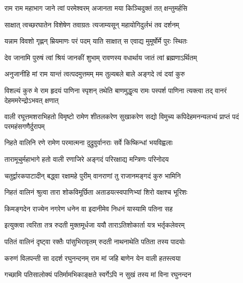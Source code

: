 \twolineshloka
{राम राम महाभाग जाने त्वां परमेश्वरम्}
{अजानता मया किञ्चिदुक्तं तत् क्षन्तुमर्हसि} %

\twolineshloka
{साक्षात् त्वच्छरघातेन विशेषेण तवाग्रतः}
{त्यजाम्यसून् महायोगिदुर्लभं तव दर्शनम्} %

\twolineshloka
{यन्नाम विवशो गृह्णन् म्रियमाणः परं पदम्}
{याति साक्षात् स एवाद्य मुमूर्षोर्मे पुरः स्थितः} %

\twolineshloka
{देव जानामि पुरुषं त्वां श्रियं जानकीं शुभाम्}
{रावणस्य वधार्थाय जातं त्वां ब्रह्मणाऽर्थितम्} %

\twolineshloka
{अनुजानीहि मां राम यान्तं त्वत्पदमुत्तमम्}
{मम तुल्यबले बाले अङ्गदे त्वं दयां कुरु} %

\threelineshloka
{विशल्यं कुरु मे राम हृदयं पाणिना स्पृशन्}
{तथेति बाणमुद्धृत्य रामः पस्पर्श पाणिना}
{त्यक्त्वा तद् वानरं देहममरेन्द्रोऽभवत् क्षणात्} %

\fourlineindentedshloka
{वाली रघूत्तमशराभिहतो विमृष्टो}
{रामेण शीतलकरेण सुखाकरेण}
{सद्यो विमुच्य कपिदेहमनन्यलभ्यं}
{प्राप्तं पदं परमहंसगणैर्दुरापम्} %





\twolineshloka
{निहते वालिनि रणे रामेण परमात्मना}
{दुद्रुवुर्वानराः सर्वे किष्किन्धां भयविह्वलाः} %

\twolineshloka
{तारामूचुर्महाभागे हतो वाली रणाजिरे}
{अङ्गदं परिरक्षाद्य मन्त्रिणः परिनोदय} %

\twolineshloka
{चतुर्द्वारकपाटादीन् बद्\mbox{}ध्वा रक्षामहे पुरीम्}
{वानराणां तु राजानमङ्गदं कुरु भामिनि} %

\twolineshloka
{निहतं वालिनं श्रुत्वा तारा शोकविमूर्छिता}
{अताडयत्स्वपाणिभ्यां शिरो वक्षश्च भूरिशः} %

\twolineshloka
{किमङ्गदेन राज्येन नगरेण धनेन वा}
{इदानीमेव निधनं यास्यामि पतिना सह} %

\twolineshloka
{इत्युक्त्वा त्वरिता तत्र रुदती मुक्तमूर्धजा}
{ययौ ताराऽतिशोकार्ता यत्र भर्तृकलेवरम्} %

\twolineshloka
{पतितं वालिनं दृष्ट्वा रक्तैः पांसुभिरावृतम्}
{रुदती नाथनाथेति पतिता तस्य पादयोः} %

\twolineshloka
{करुणं विलपन्ती सा ददर्श रघुनन्दनम्}
{राम मां जहि बाणेन येन वाली हतस्त्वया} %

\twolineshloka
{गच्छामि पतिसालोक्यं पतिर्मामभिकाङ्क्षते}
{स्वर्गेऽपि न सुखं तस्य मां विना रघुनन्दन} %

